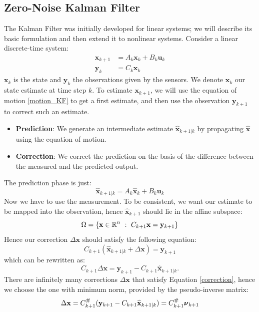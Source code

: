 \documentclass[10pt, a4paper]{report}
\begin{document}
\subsection{Zero-Noise Kalman Filter}
The Kalman Filter was initially developed for linear systems; we will describe its basic formulation and then extend it to nonlinear systems. Consider a linear discrete-time system:\begin{align}
    \mathbf x_{k+1}&=A_k\mathbf x_k+B_k\mathbf u_k\label{motion_KF}\\ 
    \mathbf y_k&=C_k\mathbf x_k
\end{align}
$\mathbf x_k$ is the state and $\mathbf y_k$ the observations given by the sensors. We denote $\widehat{\mathbf x}_k$ our state estimate at time step $k$. To estimate $\mathbf x_{k+1}$, we will use the equation of motion \eqref{motion_KF} to get a first estimate, and then use the observation $\mathbf y_{k+1}$ to correct such an estimate.\begin{itemize}
    \item \textbf{Prediction}: We generate an intermediate estimate $\widehat{\mathbf x}_{k+1|k}$ by propagating $\widehat{\mathbf x}$ using the equation of motion.
    \item \textbf{Correction}: We correct the prediction on the basis of the
    difference between the measured and the predicted output.
\end{itemize}
The prediction phase is just:\begin{equation}
    \widehat{\mathbf x}_{k+1|k}=A_k\widehat{\mathbf x}_k+B_k\mathbf u_k
\end{equation}
Now we have to use the measurement. To be consistent, we want our estimate to be mapped into the observation, hence $\widehat{\mathbf x}_{k+1}$ should lie in the affine subspace:\begin{equation}
    \Omega=\{\mathbf x\in{\mathbb R}^n \ : \ C_{k+1}\mathbf x=\mathbf y_{k+1}\}
\end{equation}
Hence our correction $\Delta\mathbf x$ should satisfy the following equation:\begin{equation}
    C_{k+1}(\widehat{\mathbf x}_{k+1|k}+\Delta\mathbf x)=\mathbf y_{k+1}
\end{equation}
which can be rewritten as:\begin{equation}\label{correction}
    C_{k+1}\Delta\mathbf x = \mathbf y_{k+1}-C_{k+1}\widehat{\mathbf x}_{k+1|k}.
\end{equation}
There are infinitely many corrections $\Delta \mathbf x$ that satisfy Equation \eqref{correction}, hence we choose the one with minimum norm, provided by the pseudo-inverse matrix:\begin{equation}
    \Delta\mathbf x =  C_{k+1}^\#(\mathbf y_{k+1}-C_{k+1}\widehat{\mathbf x}_{k+1|k})=C_{k+1}^\#{\boldsymbol{\nu}}_{k+1}
\end{equation}
\end{document}

